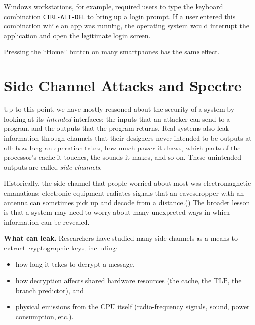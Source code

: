 \documentclass[
  letterpaper,
]{scrbook}
\theoremstyle{definition}
\theoremstyle{plain}
\theoremstyle{plain}
\theoremstyle{remark}
\begin{document}
Windows workstations, for example, required users to type the keyboard
combination \texttt{CTRL-ALT-DEL} to bring up a login prompt. If a user
entered this combination while an app was running, the operating system
would interrupt the application and open the legitimate login screen.

Pressing the ``Home'' button on many smartphones has the same effect.

\chapter{Side Channel Attacks and
Spectre}\label{side-channel-attacks-and-spectre}

Up to this point, we have mostly reasoned about the security of a system
by looking at its \emph{intended} interfaces: the inputs that an
attacker can send to a program and the outputs that the program returns.
Real systems also leak information through channels that their designers
never intended to be outputs at all: how long an operation takes, how
much power it draws, which parts of the processor's cache it touches,
the sounds it makes, and so on. These unintended outputs are called
\emph{side channels}. {}

Historically, the side channel that people worried about most was
electromagnetic emanations: electronic equipment radiates signals that
an eavesdropper with an antenna can sometimes pick up and decode from a
distance.()
{} The broader lesson is that a system may
need to worry about many unexpected ways in which information can be
revealed.

\textbf{What can leak.} Researchers have studied many side channels as a
means to extract cryptographic keys, including:

\begin{itemize}
\item
  how long it takes to decrypt a message,
\item
  how decryption affects shared hardware resources (the cache, the TLB,
  the branch predictor), and
\item
  physical emissions from the CPU itself (radio-frequency signals,
  sound, power consumption, etc.).
\end{itemize}
\end{document}

